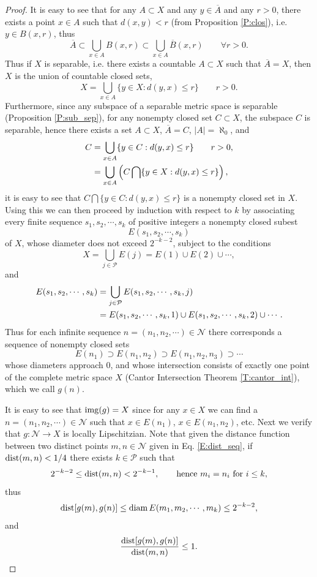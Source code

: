 \begin{proof}
It is easy to see that for any $A\subset X$ and any $y\in \overline{A}$ and any 
$r>0$, there exists a point $x\in A$ such that $d(x,y)<r$ (from Proposition 
\ref{P:clos}), i.e. $y\in B(x,r)$, thus
\[
  \overline{A} \subset \bigcup_{x\in A} B(x,r) 
          \subset \bigcup_{x\in A} \overline{B}(x,r) \qquad \forall r>0.
\]
Thus if $X$ is separable, i.e. there exists a countable $A\subset X$ such that 
$\overline{A}=X$, then $X$ is the union of countable closed sets,
\[
  X = \bigcup_{x\in A} \{y\in X: d(y,x)\leq r \} \qquad r>0.
\]
Furthermore, since any subspace of a separable metric space is separable
(Proposition \ref{P:sub_sep}), for any nonempty closed set $C\subset X$, the 
subspace $C$ is separable, hence there exists a set $A\subset X$, 
$\overline{A}=C$, $|A|=\aleph_0$, and 
\begin{align*}
  C &= \bigcup_{x\in A} \{y\in C: d(y,x)\leq r \} \qquad r>0, \notag \\
    &= \bigcup_{x\in A} \left( C\bigcap \{y\in X: d(y,x)\leq r \} \right)  
       \notag,
\end{align*}
it is easy to see that $C\bigcap \{y\in C: d(y,x)\leq r \}$ is a nonempty
closed set in $X$. 
Using this we can then proceed by induction
with respect to $k$ by associating every finite sequence $s_1,s_2,\cdots,s_k$
of positive integers a nonempty closed subest 
\[
  E(s_1,s_2,\cdots,s_k)
\]
of $X$, whose diameter does not exceed $2^{-k-2}$, subject to the conditions
\[
  X=\bigcup_{j\in\mathcal{P}} E(j) = E(1)\cup E(2)\cup\cdots,
\]
and
\begin{align*}
  E(s_1,s_2,\cdots,s_k) 
    &= \bigcup_{j\in\mathcal{P}} E(s_1,s_2,\cdots,s_k,j) \notag \\
    &= E(s_1,s_2,\cdots,s_k,1) \cup E(s_1,s_2,\cdots,s_k,2) \cup \cdots. \notag
\end{align*}
Thus for each infinite sequence $n=(n_1,n_2,\cdots)\in\mathcal{N}$ there
corresponds a sequence of nonempty closed sets
\[
  E(n_1)\supset E(n_1,n_2) \supset E(n_1,n_2,n_3) \supset \cdots
\]
whose diameters approach $0$, and whose intersection consists of exactly one
point of the complete metric space $X$ (Cantor Intersection Theorem 
\ref{T:cantor_int}), which we call $g(n)$.

It is easy to see that $\operatorname*{img}(g)=X$ since for any $x\in X$ we can find a 
$n=(n_1,n_2,\cdots)\in\mathcal{N}$ such that $x\in E(n_1)$, $x\in E(n_1,n_2)$,
etc. Next we verify that $g:\mathcal{N}\to X$ is locally Lipschitzian. Note that
given the distance function between two distinct points $m,n\in \mathcal{N}$
given in Eq. \ref{E:dist_seq}, if $\operatorname*{dist}(m,n)<1/4$ there exists 
$k\in \mathcal{P}$ such that 
\[
  2^{-k-2}\leq \operatorname*{dist}(m,n) < 2^{-k-1}, 
    \qquad \text{hence $m_i=n_i$ for $i\leq k$},
\]
thus
\[
  \operatorname*{dist}[g(m),g(n)]\leq \operatorname*{diam} E(m_1,m_2,\cdots,m_k)\leq 2^{-k-2},
\]
and 
\[
  \frac{\operatorname*{dist}[g(m),g(n)]}{\operatorname*{dist}(m,n)} \leq 1.
\]
\end{proof}

